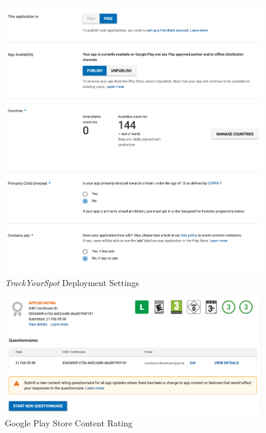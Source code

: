 \begin{figure}
    \includegraphics[width=1\textwidth, center]{figures/apppricing.png}
    \caption{\emph{TrackYourSpot} Deployment Settings}
    \label{fig:apppricing}
\end{figure}

\begin{figure}
    \includegraphics[width=1\textwidth, center]{figures/appcontentrating.png}
    \caption{Google Play Store Content Rating}
    \label{fig:contentrating}
\end{figure}


